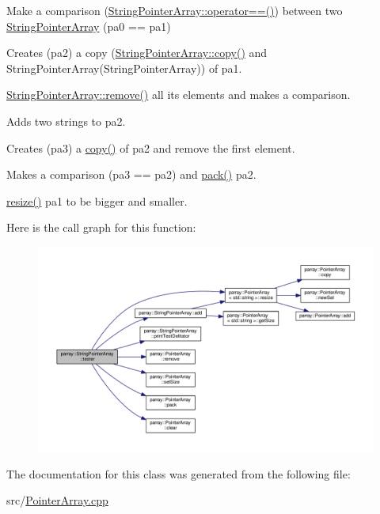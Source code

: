 Make a comparison (\hyperlink{classparray_1_1PointerArray_a050d55aeebf51f02bf59d8352664528d}{String\-Pointer\-Array\-::operator==()}) between two \hyperlink{classparray_1_1StringPointerArray_a3dcc569f7833b31b26bb72570bdc7067}{String\-Pointer\-Array} (pa0 == pa1)

Creates (pa2) a copy (\hyperlink{classparray_1_1PointerArray_a3010540e156076377ffd4428b05e1ac2}{String\-Pointer\-Array\-::copy()} and String\-Pointer\-Array(\-String\-Pointer\-Array)) of pa1.

\hyperlink{classparray_1_1PointerArray_a13ae3b9b2118416351cc63bd456ecf73}{String\-Pointer\-Array\-::remove()} all its elements and makes a comparison.

Adds two strings to pa2.

Creates (pa3) a \hyperlink{classparray_1_1PointerArray_a3010540e156076377ffd4428b05e1ac2}{copy()} of pa2 and remove the first element.

Makes a comparison (pa3 == pa2) and \hyperlink{classparray_1_1PointerArray_a13883fc7ef994a50a83ae3f9ddc4db27}{pack()} pa2.

\hyperlink{classparray_1_1PointerArray_a6d4347a899d2783d23775957ad71f743}{resize()} pa1 to be bigger and smaller. 

Here is the call graph for this function\-:\nopagebreak
\begin{figure}[H]
\begin{center}
\leavevmode
\includegraphics[width=350pt]{classparray_1_1StringPointerArray_abfac13570bec8c88311714d19ddea59b_cgraph}
\end{center}
\end{figure}




The documentation for this class was generated from the following file\-:\begin{DoxyCompactItemize}
\item 
src/\hyperlink{PointerArray_8cpp}{Pointer\-Array.\-cpp}\end{DoxyCompactItemize}
